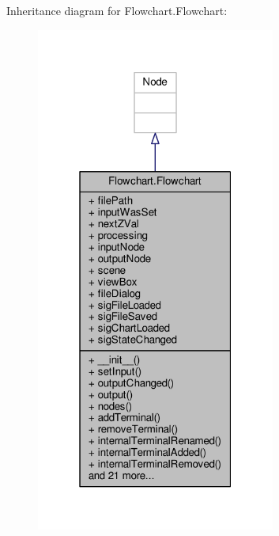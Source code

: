Inheritance diagram for Flowchart.\+Flowchart\+:\nopagebreak
\begin{figure}[H]
\begin{center}
\leavevmode
\includegraphics[width=223pt]{d4/da1/classFlowchart_1_1Flowchart__inherit__graph}
\end{center}
\end{figure}


